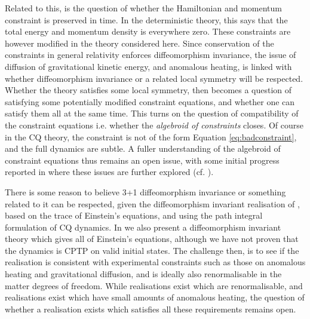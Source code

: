 \documentclass[aps,pra,showpacs,citeautoscript,amsmath,amssymb,floatfix,superscriptaddress,bbm, verbatim,amsfonts,changes,12pt,nofootinbib,longbibliography]{revtex4-2}
\begin{document}
Related to this, is the question of whether 
  the Hamiltonian and momentum constraint is preserved in time. In the deterministic theory, this says that the total energy and momentum density is everywhere zero. These constraints are however modified in the theory considered here. Since conservation of the constraints in general relativity enforces diffeomorphism invariance, the issue of diffusion of gravitational kinetic energy, and anomalous heating, is linked with whether diffeomorphism invariance or a related local symmetry will be respected.  Whether the theory satisfies some local symmetry, then becomes a question of satisfying some potentially modified constraint equations, and whether one can satisfy them all at the same time. %
  This turns on the question of compatibility of the constraint equations i.e. whether the {\it algebroid of constraints}\cite{algebroid_foot} closes. %
  Of course in the CQ theory, the constraint is not of the form Equation \eqref{eq:badconstraint}, and the full dynamics are subtle. A fuller understanding of the algebroid of constraint equations thus remains an open issue, with some initial progress reported in \cite{UCL2022constraints} where these issues are further explored (cf. \cite{oppenheim2023covariant}).
  
There is some reason to believe 3+1 diffeomorphism invariance or something related to it can be respected, given the diffeomorphism invariant realisation of \cite{oppenheim2023covariant}, based on the trace of Einstein's equations, and using the path integral formulation of CQ dynamics\cite{oppenheim2023path}. In  \cite{oppenheim2023covariant} we also present a diffeomorphism invariant theory which gives all of Einstein's equations, although we have not proven that the dynamics is CPTP on valid initial states. The  challenge then, is to see if the realisation is consistent with experimental constraints such as those on anomalous heating and gravitational diffusion, and is ideally also renormalisable in the matter degrees of freedom. While realisations exist which are renormalisable, and realisations exist which have small amounts of anomalous heating, the question of whether a realisation exists which satisfies all these requirements remains open.\label{par:challenge}
\end{document}
